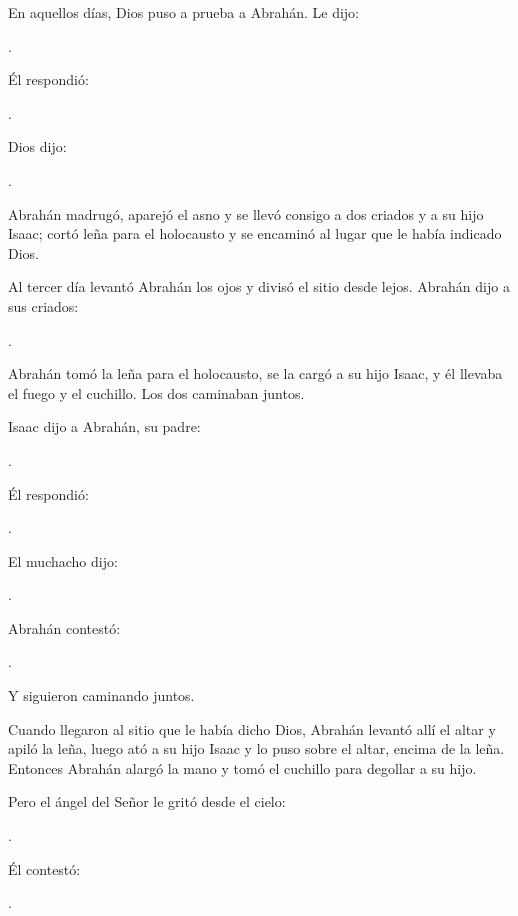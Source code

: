 


\begin{scripture}
En aquellos días, Dios puso a prueba a Abrahán. Le dijo: 

.

Él respondió: 

.

Dios dijo: 

.

Abrahán madrugó, aparejó el asno y se llevó consigo a dos criados y a su hijo Isaac; cortó leña para el holocausto y se encaminó al lugar que le había indicado Dios. 

Al tercer día levantó Abrahán los ojos y divisó el sitio desde lejos. Abrahán dijo a sus criados: 

.


Abrahán tomó la leña para el holocausto, se la cargó a su hijo Isaac, y él llevaba el fuego y el cuchillo. Los dos caminaban juntos. 

Isaac dijo a Abrahán, su padre: 

.

Él respondió: 

.

El muchacho dijo: 

.

Abrahán contestó: 

.

Y siguieron caminando juntos. 

Cuando llegaron al sitio que le había dicho Dios, Abrahán levantó allí el altar y apiló la leña, luego ató a su hijo Isaac y lo puso sobre el altar, encima de la leña. Entonces Abrahán alargó la mano y tomó el cuchillo para degollar a su hijo. 

Pero el ángel del Señor le gritó desde el cielo: 

.

Él contestó: 

.


\end{scripture}
